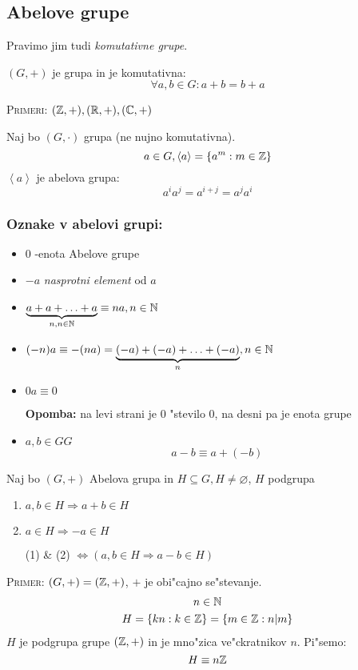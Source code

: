 \subsection{Abelove grupe}
Pravimo jim tudi \emph{komutativne grupe}.

$(G, +)$ je grupa in je komutativna:
\begin{equation*}
\forall a, b \in G: a + b = b + a
\end{equation*}

\textsc{Primeri:} $(\mathbb{Z}, +), (\mathbb{R}, +), (\mathbb{C}, +)$

Naj bo $(G, \cdot)$ grupa (ne nujno komutativna).
\begin{equation*}
a \in G, \left< a \right> = \{a^m: m \in \mathbb{Z} \}
\end{equation*}
$\left<a\right>$ je abelova grupa:
\begin{equation*}
a^i a^j = a^{i+j} = a^j a^i
\end{equation*}

\subsubsection*{Oznake v abelovi grupi:}
\begin{itemize}
	\item $0$ -enota Abelove grupe
	\item $-a$ \emph{nasprotni element} od $a$
	\item $\underbrace{a + a + \ldots + a}_{n, n \in \mathbb{N}} \equiv na, n \in \mathbb{N}$
	\item $(-n)a \equiv -(na) = \underbrace{(-a) + (-a) + \ldots + (-a)}_{n}, n \in \mathbb{N}$
	\item $0a \equiv 0$ 
	
	\textbf{Opomba:} na levi strani je 0 "stevilo 0, na desni pa je enota grupe
	\item  $a, b \in GG$
	\begin{equation*}
	a - b \equiv a + (-b)
	\end{equation*}
\end{itemize}

Naj bo $(G, +)$ Abelova grupa in $H \subseteq G, H \neq \varnothing$, $H$ podgrupa
\begin{enumerate}[(1)]
	\item $a, b \in H \Rightarrow a + b \in H$
	\item $a \in H \Rightarrow -a \in H$
	\item[(1) \& (2)] $\iff (a, b \in H \Rightarrow a - b \in H)$
\end{enumerate}
\textsc{Primer:} $(G, +) = (\mathbb{Z}, +)$, $+$ je obi"cajno se"stevanje.
\begin{gather*}
n \in \mathbb{N} \\
H = \{kn: k \in \mathbb{Z}\} = \{m \in \mathbb{Z}: n | m\}
\end{gather*}
$H$ je podgrupa grupe $(\mathbb{Z}, +)$ in je mno"zica ve"ckratnikov $n$. Pi"semo:
\begin{equation*}
H \equiv n\mathbb{Z}
\end{equation*}


